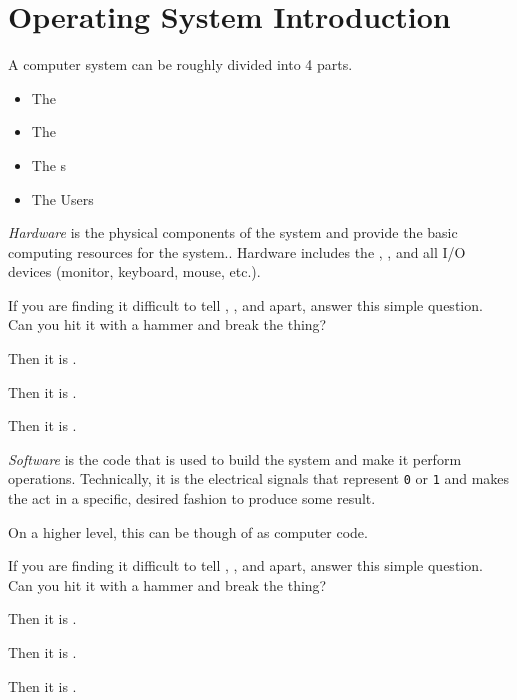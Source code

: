 \section{Operating System Introduction}\label{sec:OS_Intro}
A computer system can be roughly divided into 4 parts.
\begin{itemize}[noitemsep]
\item The 
\item The 
\item The s
\item The Users
\end{itemize}

\begin{definition}[Hardware]\label{def:Hardware}
  \emph{Hardware} is the physical components of the system and provide the basic computing resources for the system..
  Hardware includes the , , and all I/O devices (monitor, keyboard, mouse, etc.).

  \begin{remark}\label{rmk:Hardware_Differentiate}
    If you are finding it difficult to tell , , and  apart, answer this simple question.
    Can you hit it with a hammer and break the thing?
    \begin{description}[noitemsep]
    \item[Yes] Then it is .
    \item[No] Then it is .
    \item[Yes and No] Then it is .
    \end{description}
  \end{remark}
\end{definition}

\begin{definition}[Software]\label{def:Software}
  \emph{Software} is the code that is used to build the system and make it perform operations.
  Technically, it is the electrical signals that represent \texttt{0} or \texttt{1} and makes the  act in a specific, desired fashion to produce some result.

  On a higher level, this can be though of as computer code.

  \begin{remark}\label{rmk:Software_Differentiate}
    If you are finding it difficult to tell , , and  apart, answer this simple question.
    Can you hit it with a hammer and break the thing?
    \begin{description}[noitemsep]
    \item[Yes] Then it is .
    \item[No] Then it is .
    \item[Yes and No] Then it is .
    \end{description}
  \end{remark}
\end{definition}


